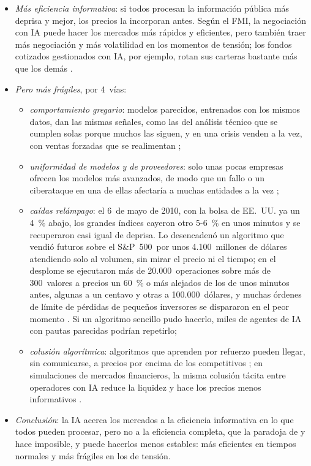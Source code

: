 \documentclass[11pt]{article}
\begin{document}
\begin{itemize}
\item \emph{Más eficiencia informativa}: si todos procesan la información pública más deprisa y mejor, los precios la incorporan antes. Según el FMI, la negociación con IA puede hacer los mercados más rápidos y eficientes, pero también traer más negociación y más volatilidad en los momentos de tensión; los fondos cotizados gestionados con IA, por ejemplo, rotan sus carteras bastante más que los demás \parencite{FMI2024GFSR3}.
\item \emph{Pero más frágiles}, por 4~vías:
  \begin{itemize}
  \item \emph{comportamiento gregario}: modelos parecidos, entrenados con los mismos datos, dan las mismas señales, como las del análisis técnico que se cumplen solas porque muchos las siguen, y en una crisis venden a la vez, con ventas forzadas que se realimentan \parencite{BIS2024AER,FMI2024GFSR3};
  \item \emph{uniformidad de modelos y de proveedores}: solo unas pocas empresas ofrecen los modelos más avanzados, de modo que un fallo o un ciberataque en una de ellas afectaría a muchas entidades a la vez \parencite{BIS2024AER,FSB2024AI};
  \item \emph{caídas relámpago}: el 6~de mayo de 2010, con la bolsa de EE.~UU. ya un 4~\% abajo, los grandes índices cayeron otro 5-6~\% en unos minutos y se recuperaron casi igual de deprisa. Lo desencadenó un algoritmo que vendió futuros sobre el S\&P~500~por unos 4.100~millones de dólares atendiendo solo al volumen, sin mirar el precio ni el tiempo; en el desplome se ejecutaron más de 20.000~operaciones sobre más de 300~valores a precios un 60~\% o más alejados de los de unos minutos antes, algunas a un centavo y otras a 100.000~dólares, y muchas órdenes de límite de pérdidas de pequeños inversores se dispararon en el peor momento \parencite{CFTCSEC2010May6}. Si un algoritmo sencillo pudo hacerlo, miles de agentes de IA con pautas parecidas podrían repetirlo;
  \item \emph{colusión algorítmica}: algoritmos que aprenden por refuerzo pueden llegar, sin comunicarse, a precios por encima de los competitivos \parencite{CalvanoEtAl2020Artificial}; en simulaciones de mercados financieros, la misma colusión tácita entre operadores con IA reduce la liquidez y hace los precios menos informativos \parencite{DouGoldsteinJi2025AIPowered}.
  \end{itemize}
\item \emph{Conclusión}: la IA acerca los mercados a la eficiencia informativa en lo que todos pueden procesar, pero no a la eficiencia completa, que la paradoja de  y  hace imposible, y puede hacerlos menos estables: más eficientes en tiempos normales y más frágiles en los de tensión.
\end{itemize}
\end{document}
